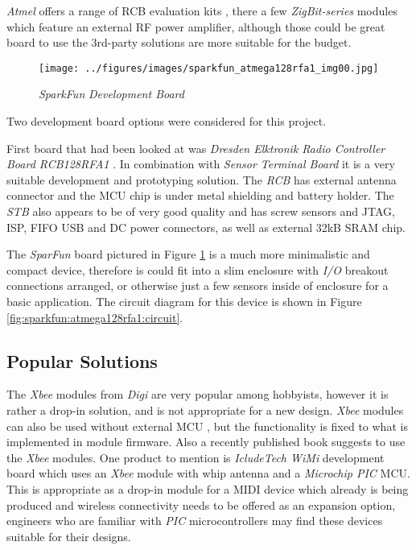  \emph{Atmel} offers a range of RCB evaluation kits
 \cite{links:atmel:rcb}, there a few \emph{ZigBit-series}
 modules which feature an external RF power amplifier,
 although those could be great board to use the 3rd-party
 solutions are more suitable for the budget.

 \begin{figure}
 \texttt{[image: ../figures/images/sparkfun\_atmega128rfa1\_img00.jpg]}
 \caption{\emph{SparkFun}  \emph{Development Board}} \label{fig:sparkfun:atmega128rfa1:image}
 \end{figure}

 Two development board options were considered for this project.

 First  board that had been looked at 
 was \emph{Dresden Elktronik Radio Controller Board RCB128RFA1}
 \cite{links:de:rcb}. In combination with \emph{Sensor Terminal
 Board} \cite{links:de:stb} it is a very suitable development 
 and prototyping solution. The \emph{RCB} has external antenna
 connector and the MCU chip is under metal shielding and battery
 holder. The \emph{STB} also appears to be of very good quality
 and has screw sensors and JTAG, ISP, FIFO USB and DC power
 connectors, as well as external 32kB SRAM chip.

 The \emph{SparFun} board pictured in Figure
 \ref{fig:sparkfun:atmega128rfa1:image}
 is a much more minimalistic and compact device,
 therefore is could fit into a slim enclosure with
 \emph{I/O} breakout connections arranged, or otherwise
 just a few sensors inside of enclosure for a basic
 application. The circuit diagram for this device is
 shown in Figure \ref{fig:sparkfun:atmega128rfa1:circuit}.

\subsection{Popular Solutions}

 The \emph{Xbee}\cite{links:digi:xbee} modules from \emph{Digi}
 are very popular among hobbyists, however it is rather a
 drop-in solution, and is not appropriate for a new design.
 \emph{Xbee} modules can also be used without external MCU
 \cite{links:misc:xbeemidi}, but the functionality is fixed
 to what is implemented in module firmware. Also a recently
 published \cite{noble2009programming} book suggests to
 use the \emph{Xbee} modules.
 One product to mention is \emph{IcludeTech WiMi} \cite{links:includetech:wimi}
 development board which uses an \emph{Xbee} module with whip antenna and a
 \emph{Microchip PIC} MCU. This is appropriate as a drop-in module
 for a MIDI device which already is being produced and wireless
 connectivity needs to be offered as an expansion option, engineers
 who are familiar with \emph{PIC} microcontrollers may find these
 devices suitable for their designs.
